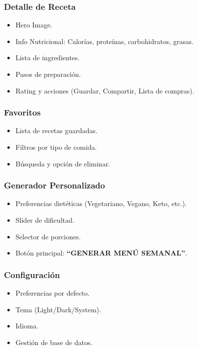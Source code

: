 \documentclass[stu, 12pt, letterpaper, donotrepeattitle, floatsintext, natbib]{apa7}
\begin{document}
\subsubsection{Detalle de Receta}
\begin{itemize}
    \item Hero Image.
    \item Info Nutricional: Calorías, proteínas, carbohidratos, grasas.
    \item Lista de ingredientes.
    \item Pasos de preparación.
    \item Rating y acciones (Guardar, Compartir, Lista de compras).
\end{itemize}

\subsubsection{Favoritos}
\begin{itemize}
    \item Lista de recetas guardadas.
    \item Filtros por tipo de comida.
    \item Búsqueda y opción de eliminar.
\end{itemize}

\subsubsection{Generador Personalizado}
\begin{itemize}
    \item Preferencias dietéticas (Vegetariano, Vegano, Keto, etc.).
    \item Slider de dificultad.
    \item Selector de porciones.
    \item Botón principal: \textbf{``GENERAR MENÚ SEMANAL''}.
\end{itemize}

\subsubsection{Configuración}
\begin{itemize}
    \item Preferencias por defecto.
    \item Tema (Light/Dark/System).
    \item Idioma.
    \item Gestión de base de datos.
\end{itemize}
\end{document}
